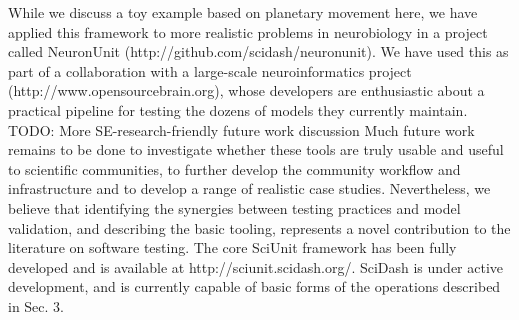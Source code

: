 \documentclass[9pt]{sig-alternate}
\begin{document}
While we discuss a toy example based on planetary movement here, we have applied this framework to more realistic problems in neurobiology in a project called NeuronUnit (http://github.com/scidash/neuronunit). We have used this as part of a collaboration with a large-scale neuroinformatics project (http://www.opensourcebrain.org), whose developers are enthusiastic about a practical pipeline for testing the dozens of models they currently maintain. TODO: More SE-research-friendly future work discussion Much future work remains to be done to investigate whether these tools are truly usable and useful to scientific communities, to further develop the community workflow and infrastructure and to develop a range of realistic case studies. Nevertheless, we believe that identifying the synergies between testing practices and model validation, and describing the basic tooling, represents a novel contribution to the literature on software testing. The core SciUnit framework has been fully developed and is available at http://sciunit.scidash.org/. SciDash is under active development, and is currently capable of basic forms of the operations described in Sec. 3. 


\end{document}
